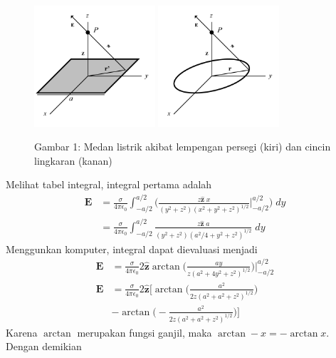 \documentclass[../../../main.tex]{subfiles}
\begin{document}
\begin{figure}[ht]
    \centering
    \includegraphics[width=0.4\textwidth]{../Rss/Electromagnetism/Electrostatics/Sqrt.png}
    \includegraphics[width=0.4\textwidth]{../Rss/Electromagnetism/Electrostatics/Circ.png}
    \caption*{Gambar 1: Medan listrik akibat lempengan persegi (kiri) dan cincin lingkaran (kanan)}
\end{figure}
Melihat tabel integral, integral pertama adalah
\begin{align*}
    \mathbf{E}&=\frac{\sigma}{4\pi\epsilon_0} \int_{-a/2}^{a/2} \biggl(\frac{z\boldsymbol{\hat{z}}\;x}{(y^2+z^2)(x^2+y^2+z^2)^{1/2}}\Bigg|_{-a/2}^{a/2}\biggr)\;dy\\
    &=\frac{\sigma}{4\pi\epsilon_0} \int_{-a/2}^{a/2} \frac{z\boldsymbol{\hat{z}}\;a}{(y^2+z^2)(a^2/4+y^2+z^2)^{1/2}}\;dy
\end{align*}
Menggunkan komputer, integral dapat dievaluasi menjadi
\begin{align*}
    \mathbf{E}&=\frac{\sigma}{4\pi\epsilon_0} 2\boldsymbol{\hat{z}}\arctan\biggl(\frac{ay}{z(a^2+4y^2+z^2)^{1/2}}\biggr)\Bigg|_{-a/2}^{a/2}\\
    \mathbf{E}&=\frac{\sigma}{4\pi\epsilon_0} 2\boldsymbol{\hat{z}}\Bigg[ \arctan\biggl(\frac{a^2}{2z(a^2+a^2+z^2)^{1/2}}\biggr)\\& -\arctan\biggl(-\frac{a^2}{2z(a^2+a^2+z^2)^{1/2}}\biggr)\Bigg]
\end{align*}
Karena $\arctan $ merupakan fungsi ganjil, maka $\arctan -x=-\arctan x$. Dengan demikian
\end{document}
